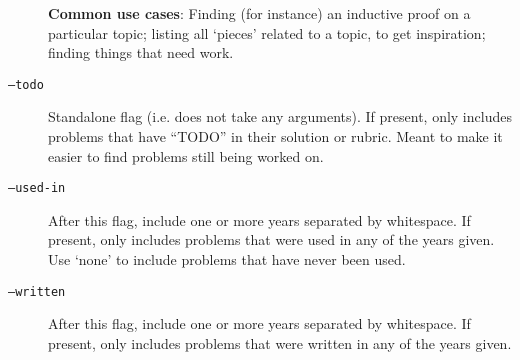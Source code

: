 \begin{description}
        \textbf{Common use cases}: Finding (for instance) an inductive proof 
        on a particular topic; listing all `pieces' related to a topic, to get
        inspiration; finding things that need work.
      \item[\texttt{--todo}] 
        Standalone flag (i.e. does not take any arguments). If present, only 
        includes problems that have ``TODO'' in their 
        solution or rubric. Meant to make it easier to find problems still 
        being worked on.
      \item[\texttt{--used-in}] 
        After this flag, include one or more years separated by whitespace.
        If present, only includes problems that were used in any of the years 
        given. Use `none' to include problems that have never been used. 
      \item[\texttt{--written}] 
        After this flag, include one or more years separated by whitespace. 
        If present, only includes problems that were written in any of the 
        years given.
    \end{description}
